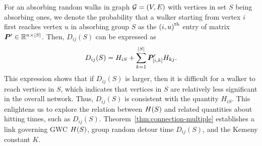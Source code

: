 \documentclass[10pt,twocolumn,twoside]{IEEEtran}
\begin{document}
For an absorbing random walks in graph \(\mathcal{G}=(V,E)\)  with vertices in set \(S\)  being absorbing ones,  we denote the probability that a walker starting from vertex \(i\) first reaches vertex \(u\) in absorbing group \(S\) as the \({(i,u)}^{\rm{th}}\) entry of matrix \(\boldsymbol{P}'\in\mathbb{R}^{n\times\left|S \right|}\). Then, \(D_{ij}(S)\) can be expressed as
\begin{equation}
    D_{ij}(S)= H_{iS}+\sum_{k=1}^{\left|S \right|}\boldsymbol{P}'_{[i,k]}H_{kj}.
\end{equation}
This expression shows that  if \(D_{ij}(S)\) is larger, then it is difficult for a walker to reach vertices in \(S\), which indicates that vertices in \(S\) are relatively less significant in the overall network. Thus, \(D_{ij}(S)\) is consistent with the quantity $H_{iS}$. This enlightens us to explore the relation between \(H(S)\) and related quantities about hitting times, such as  \(D_{ij}(S)\). Theorem~\ref{thm:connection-multiple} establishes a link governing GWC \(H(S)\), group random detour time \(D_{ij}(S)\), and the Kemeny constant \(K\).
\end{document}
